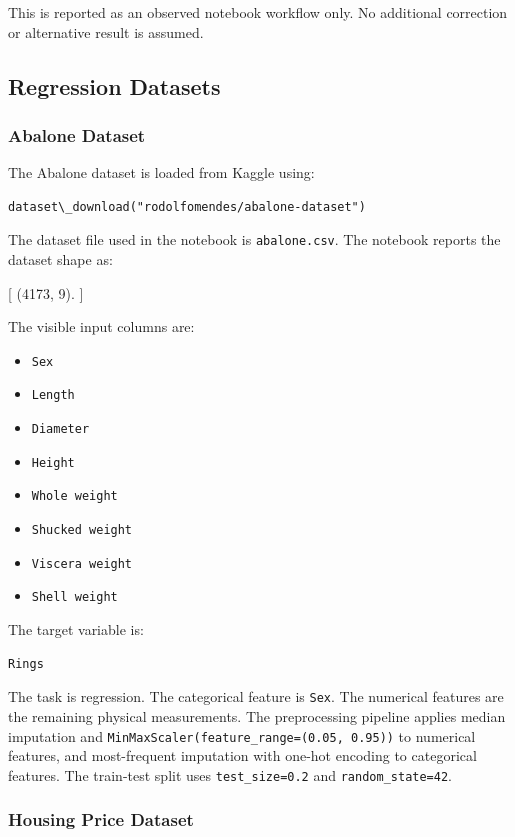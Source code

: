 This is reported as an observed notebook workflow only. No additional correction or alternative result is assumed.

\subsection{Regression Datasets}

\subsubsection{Abalone Dataset}

The Abalone dataset is loaded from Kaggle using:

\begin{verbatim}
dataset\_download("rodolfomendes/abalone-dataset")
\end{verbatim}

The dataset file used in the notebook is \texttt{abalone.csv}. The notebook reports the dataset shape as:

[
    (4173, 9).
]

The visible input columns are:

\begin{itemize}
    \item \texttt{Sex}
    \item \texttt{Length}
    \item \texttt{Diameter}
    \item \texttt{Height}
    \item \texttt{Whole weight}
    \item \texttt{Shucked weight}
    \item \texttt{Viscera weight}
    \item \texttt{Shell weight}
\end{itemize}

The target variable is:

\begin{verbatim}
Rings
\end{verbatim}

The task is regression. The categorical feature is \texttt{Sex}. The numerical features are the remaining physical measurements. The preprocessing pipeline applies median imputation and \texttt{MinMaxScaler(feature\_range=(0.05, 0.95))} to numerical features, and most-frequent imputation with one-hot encoding to categorical features. The train-test split uses \texttt{test\_size=0.2} and \texttt{random\_state=42}.

\subsubsection{Housing Price Dataset}

